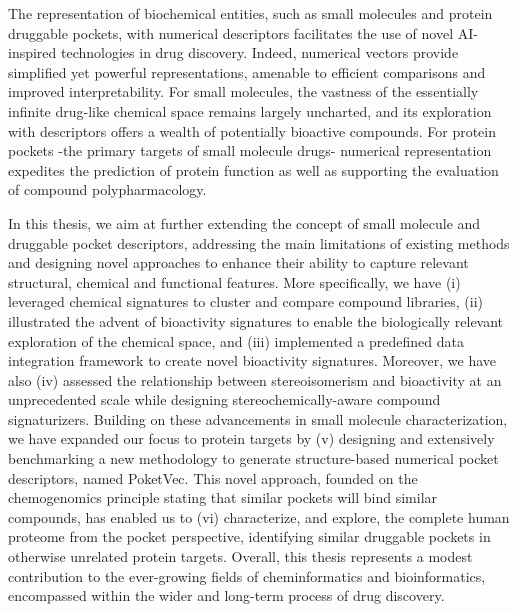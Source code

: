 
The representation of biochemical entities, such as small molecules and protein druggable pockets, with numerical descriptors facilitates the use of novel AI-inspired technologies in drug discovery. Indeed, numerical vectors provide simplified yet powerful representations, amenable to efficient comparisons and improved interpretability. For small molecules, the vastness of the essentially infinite drug-like chemical space remains largely uncharted, and its exploration with descriptors offers a wealth of potentially bioactive compounds. For protein pockets -the primary targets of small molecule drugs- numerical representation expedites the prediction of protein function as well as supporting the evaluation of compound polypharmacology.  

In this thesis, we aim at further extending the concept of small molecule and druggable pocket descriptors, addressing the main limitations of existing methods and designing novel approaches to enhance their ability to capture relevant structural, chemical and functional features. More specifically, we have (i) leveraged chemical signatures to cluster and compare compound libraries, (ii) illustrated the advent of bioactivity signatures to enable the biologically relevant exploration of the chemical space, and (iii) implemented a predefined data integration framework to create novel bioactivity signatures. Moreover, we have also (iv) assessed the relationship between stereoisomerism and bioactivity at an unprecedented scale while designing stereochemically-aware compound signaturizers. Building on these advancements in small molecule characterization, we have expanded our focus to protein targets by (v) designing and extensively benchmarking a new methodology to generate structure-based numerical pocket descriptors, named PoketVec. This novel approach, founded on the chemogenomics principle stating that similar pockets will bind similar compounds, has enabled us to (vi) characterize, and explore, the complete human proteome from the pocket perspective, identifying similar druggable pockets in otherwise unrelated protein targets. Overall, this thesis represents a modest contribution to the ever-growing fields of cheminformatics and bioinformatics, encompassed within the wider and long-term process of drug discovery. 